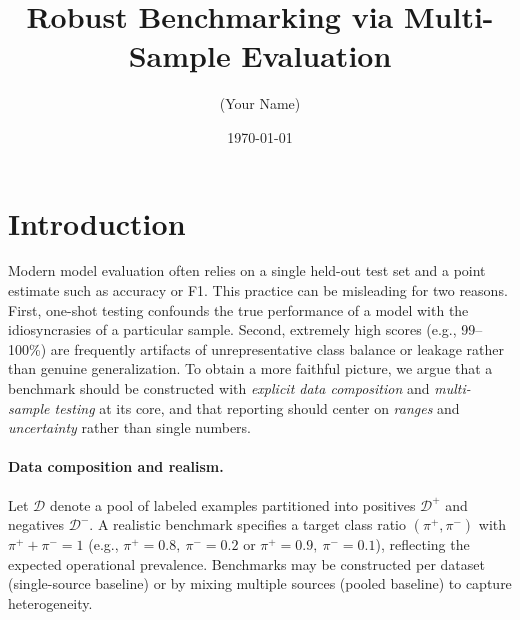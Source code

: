 \documentclass[11pt]{article}
\title{Robust Benchmarking via Multi-Sample Evaluation}
\author{(Your Name)}
\date{\today}
\begin{document}
\maketitle


\section*{Introduction}

Modern model evaluation often relies on a single held-out test set and a point estimate such as accuracy or F1. This practice can be misleading for two reasons. First, one-shot testing confounds the true performance of a model with the idiosyncrasies of a particular sample. Second, extremely high scores (e.g., 99--100\%) are frequently artifacts of unrepresentative class balance or leakage rather than genuine generalization. To obtain a more faithful picture, we argue that a benchmark should be constructed with \emph{explicit data composition} and \emph{multi-sample testing} at its core, and that reporting should center on \emph{ranges} and \emph{uncertainty} rather than single numbers.

\paragraph{Data composition and realism.}
Let $\mathcal{D}$ denote a pool of labeled examples partitioned into positives $\mathcal{D}^{+}$ and negatives $\mathcal{D}^{-}$.
A realistic benchmark specifies a target class ratio $(\pi^{+}, \pi^{-})$ with $\pi^{+} + \pi^{-} = 1$ (e.g., $\pi^{+}=0.8,\ \pi^{-}=0.2$ or $\pi^{+}=0.9,\ \pi^{-}=0.1$), reflecting the expected operational prevalence.
Benchmarks may be constructed per dataset (single-source baseline) or by mixing multiple sources (pooled baseline) to capture heterogeneity.
\end{document}
